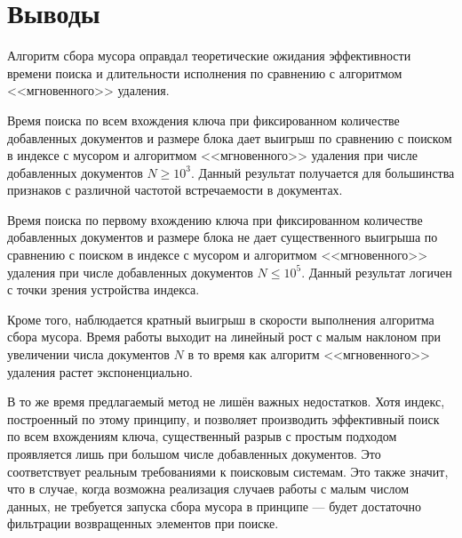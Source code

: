 \newpage
\section{Выводы}

Алгоритм сбора мусора оправдал теоретические ожидания эффективности времени
поиска и длительности исполнения по сравнению с алгоритмом <<мгновенного>>
удаления. 

Время поиска по всем вхождения ключа при фиксированном количестве
добавленных документов и размере блока дает выигрыш по сравнению
с поиском в индексе с мусором и алгоритмом <<мгновенного>> удаления при числе
добавленных документов $N \ge 10^3$. Данный результат получается для большинства
признаков с различной частотой встречаемости в документах.

Время поиска по первому вхождению ключа при фиксированном количестве
добавленных документов и размере блока не дает существенного выигрыша по
сравнению с поиском в индексе с мусором и алгоритмом <<мгновенного>> удаления
при числе добавленных документов $N \leq 10^5$. Данный результат логичен с точки
зрения устройства индекса.

Кроме того, наблюдается кратный выигрыш в скорости выполнения алгоритма сбора
мусора. Время работы выходит на линейный рост с малым наклоном при увеличении
числа документов $N$ в то время как алгоритм <<мгновенного>> удаления растет
экспоненциально.

В то же время предлагаемый метод не лишён важных недостатков. Хотя индекс,
построенный по этому принципу, и позволяет производить эффективный поиск по
всем вхождениям ключа, существенный разрыв с простым подходом проявляется лишь
при большом числе добавленных документов. Это соответствует реальным требованиями
к поисковым системам. Это также значит, что в случае, когда возможна реализация
случаев работы с малым числом данных, не требуется запуска сбора мусора в принципе
— будет достаточно фильтрации возвращенных элементов при поиске.
